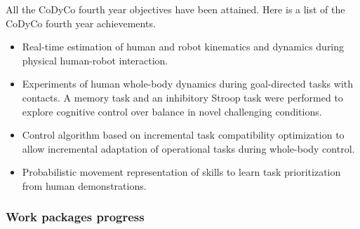 \documentclass[12pt,a4paper,twoside]{article}
\begin{document}
All the CoDyCo fourth year objectives have been attained. Here is a list of the CoDyCo fourth year achievements. 
\begin{itemize}

\item Real-time estimation of human and robot kinematics and dynamics during physical human-robot interaction. 

\item Experiments of human whole-body dynamics during goal-directed tasks with contacts. A memory task and an inhibitory Stroop task were performed to explore cognitive control over balance in novel challenging conditions.

\item Control algorithm based on incremental task compatibility optimization to allow incremental adaptation of operational tasks during whole-body control. 

\item Probabilistic movement representation of skills to learn task prioritization from human demonstrations. 

\end{itemize}

\subsubsection{Work packages progress}





























\end{document}
